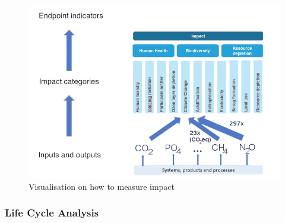\documentclass[../summary.tex]{subfiles}
\begin{document}
\begin{figure}[H]
	\centering
	\includegraphics[width=0.78\linewidth]{../images/Visualisation_for_measuring_impact}
	\caption{Visualisation on how to measure impact}
	\label{fig:visualisationformeasuringimpact}
\end{figure}

\subsubsection{Life Cycle Analysis}
\end{document}

